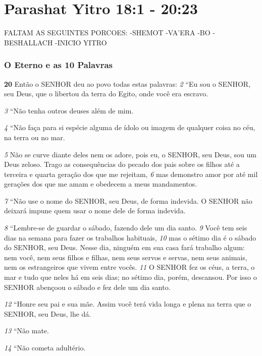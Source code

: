 \section*{Parashat Yitro 18:1 - 20:23}

\bigskip
FALTAM AS SEGUINTES PORCOES:
-SHEMOT
-VA'ERA
-BO
-BESHALLACH
-INICIO YITRO


   
\bigskip
\subsubsection*{O Eterno e as 10 Palavras}
\textbf{\large 20}
 Então o SENHOR deu ao povo todas estas palavras: 
\textit{\tiny 2} 
“Eu  sou o SENHOR, seu Deus, que o libertou da terra do Egito, onde você era escravo. 

\medskip
\textit{\tiny 3} 
“Não tenha outros deuses além de mim. 

\medskip
\textit{\tiny 4} 
“Não faça para si espécie alguma de ídolo ou imagem de qualquer coisa no céu, na terra ou no mar. 

\medskip
\textit{\tiny 5} 
Não se curve diante deles nem os adore, pois eu, o SENHOR,
 seu Deus, sou um Deus zeloso. Trago as consequências do pecado dos pais sobre os filhos até a terceira e quarta geração dos que me rejeitam, 
\textit{\tiny 6} 
mas demonstro amor por até mil gerações dos que me amam e obedecem a meus
 mandamentos. 

\medskip
\textit{\tiny 7} 
“Não use o nome do SENHOR, seu Deus, de forma indevida. O SENHOR não deixará impune quem usar o nome dele de forma indevida. 

\medskip
\textit{\tiny 8} 
“Lembre-se de guardar o sábado, fazendo dele um dia santo. 
\textit{\tiny 9} 
Você tem seis dias
 na semana para fazer os trabalhos habituais, 
\textit{\tiny 10}
mas o sétimo dia é o sábado do
 SENHOR, seu Deus. Nesse dia, ninguém em sua casa fará trabalho algum: nem
 você, nem seus filhos e filhas, nem seus servos e servas, nem seus animais, nem os estrangeiros que vivem entre vocês. 
\textit{\tiny 11}
O SENHOR fez os céus, a terra, o mar e
 tudo que neles há em seis dias; no sétimo dia, porém, descansou. Por isso o SENHOR abençoou o sábado e fez dele um dia santo.

\medskip
\textit{\tiny 12}
“Honre seu pai e sua mãe. Assim você terá vida longa e plena na terra que o SENHOR, seu Deus, lhe dá.

\medskip
\textit{\tiny 13}
“Não mate.

\medskip
\textit{\tiny 14}
“Não cometa adultério.

